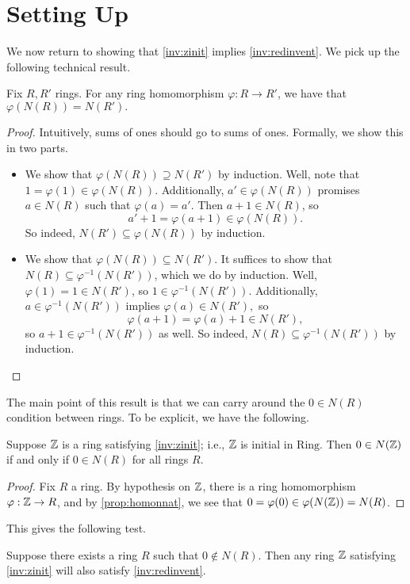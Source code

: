 \documentclass{article}
\begin{document}
\section{Setting Up}
We now return to showing that \autoref{inv:zinit} implies \autoref{inv:redinvent}. We pick up the following technical result.
\begin{proposition} \label{prop:homonnat}
	Fix $R,R'$ rings. For any ring homomorphism $\varphi:R\to R'$, we have that $\varphi(N(R))=N(R').$
\end{proposition}
\begin{proof}
	Intuitively, sums of ones should go to sums of ones. Formally, we show this in two parts.
	\begin{itemize}
		\item We show that $\varphi(N(R))\supseteq N(R')$ by induction. Well, note that $1=\varphi(1)\in\varphi(N(R))$. Additionally, $a'\in\varphi(N(R))$ promises $a\in N(R)$ such that $\varphi(a)=a'$. Then $a+1\in N(R)$, so
		\[a'+1=\varphi(a+1)\in\varphi(N(R)).\]
		So indeed, $N(R')\subseteq\varphi(N(R))$ by induction.
		\item We show that $\varphi(N(R))\subseteq N(R')$. It suffices to show that $N(R)\subseteq\varphi^{-1}(N(R'))$, which we do by induction. Well, $\varphi(1)=1\in N(R')$, so $1\in\varphi^{-1}(N(R'))$. Additionally, $a\in\varphi^{-1}(N(R'))$ implies $\varphi(a)\in N(R'),$ so
		\[\varphi(a+1)=\varphi(a)+1\in N(R'),\]
		so $a+1\in\varphi^{-1}(N(R'))$ as well. So indeed, $N(R)\subseteq\varphi^{-1}(N(R'))$ by induction.
		\qedhere
	\end{itemize}
\end{proof}
The main point of this result is that we can carry around the $0\in N(R)$ condition between rings. To be explicit, we have the following.
\begin{corollary} \label{cor:carryzero}
	Suppose $\mathbb Z$ is a ring satisfying \autoref{inv:zinit}; i.e., $\mathbb Z$ is initial in $\mathrm{Ring}$. Then $0\in N(\mathbb Z)$ if and only if $0\in N(R)$ for all rings $R$.
\end{corollary}
\begin{proof}
	Fix $R$ a ring. By hypothesis on $\mathbb Z$, there is a ring homomorphism $\varphi:\mathbb Z\to R$, and by \autoref{prop:homonnat}, we see that $0=\varphi(0)\in\varphi(N(\mathbb Z))=N(R)$.
\end{proof}
This gives the following test.
\begin{proposition} \label{prop:thetest}
	Suppose there exists a ring $R$ such that $0\notin N(R)$. Then any ring $\mathbb Z$ satisfying \autoref{inv:zinit} will also satisfy \autoref{inv:redinvent}.
\end{proposition}
\end{document}
